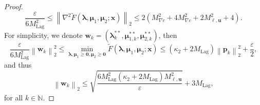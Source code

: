 \documentclass[aos]{imsart}
\numberwithin{equation}{section}
\theoremstyle{plain}
\begin{document}
\begin{appendix}
\begin{proof}
    \begin{equation*}
        \frac{\varepsilon}{6 M_{\text{Lag}}^2 } \leq \left\| \nabla^2 \widetilde{F}(\bm{\lambda}, \bm{\mu}_{1}, \bm{\mu}_2; \bm{x}) \right\|_2 \leq 2\left( M_{\nabla c}^{2} + 4 M_{\nabla c}^{2} + 2 M_{\bm{\ell},\bm{u}}^{2} + 4\right).
    \end{equation*}
    For simplicity, we denote $\bm{w}_k = (\bm{\lambda}_{k}^{**}, \bm{\mu}_{1,k}^{**}, \bm{\mu}_{2,k}^{**})$, then 
    \begin{equation*}
        \frac{\varepsilon}{6 M_{\text{Lag}}^2 } \left\|\bm{w}_k \right\|_2^2 \leq \min_{\bm{\lambda}, \bm{\mu}_{1} \geq \bm{0}, \bm{\mu}_{2} \geq \bm{0}}  \widetilde{F}(\bm{\lambda}, \bm{\mu}_{1}, \bm{\mu}_2; \bm{x}) \leq (\kappa_2 + 2 M_{\text{Lag}}) \left\| \bm{p}_k \right\|_2^2 + \frac{\varepsilon}{2},
    \end{equation*}
    and thus 
    \begin{equation}
    \label{eq22}
        \left\|\bm{w}_k \right\|_2 \leq \sqrt{\frac{6 M_{\text{Lag}}^2 \left( \kappa_2 + 2 M_{\text{Lag}} \right) M_{\bm{\ell},\bm{u}}^{2} }{\varepsilon}} + 3 M_{\text{Lag}},
    \end{equation}
    for all $k \in \mathbb{N}$. 



\end{proof}
\end{appendix}
\end{document}
